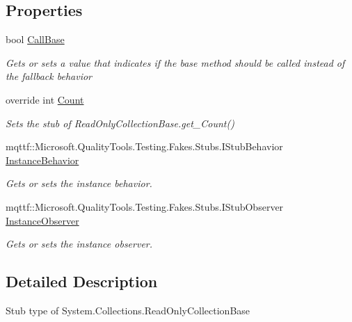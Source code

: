 \subsection*{Properties}
\begin{DoxyCompactItemize}
\item 
bool \hyperlink{class_system_1_1_collections_1_1_fakes_1_1_stub_read_only_collection_base_a8c18cc032129dda04c942f4e38a32b25}{Call\-Base}
\begin{DoxyCompactList}\small\item\em Gets or sets a value that indicates if the base method should be called instead of the fallback behavior\end{DoxyCompactList}\item 
override int \hyperlink{class_system_1_1_collections_1_1_fakes_1_1_stub_read_only_collection_base_af61a3700748e0a65dbe6def4b81cf1e8}{Count}
\begin{DoxyCompactList}\small\item\em Sets the stub of Read\-Only\-Collection\-Base.\-get\-\_\-\-Count()\end{DoxyCompactList}\item 
mqttf\-::\-Microsoft.\-Quality\-Tools.\-Testing.\-Fakes.\-Stubs.\-I\-Stub\-Behavior \hyperlink{class_system_1_1_collections_1_1_fakes_1_1_stub_read_only_collection_base_ae32b871292a77047b61c2c9e167e88e1}{Instance\-Behavior}
\begin{DoxyCompactList}\small\item\em Gets or sets the instance behavior.\end{DoxyCompactList}\item 
mqttf\-::\-Microsoft.\-Quality\-Tools.\-Testing.\-Fakes.\-Stubs.\-I\-Stub\-Observer \hyperlink{class_system_1_1_collections_1_1_fakes_1_1_stub_read_only_collection_base_a7b954c4cfa1574e87bef93bf1e3d0a26}{Instance\-Observer}
\begin{DoxyCompactList}\small\item\em Gets or sets the instance observer.\end{DoxyCompactList}\end{DoxyCompactItemize}


\subsection{Detailed Description}
Stub type of System.\-Collections.\-Read\-Only\-Collection\-Base



